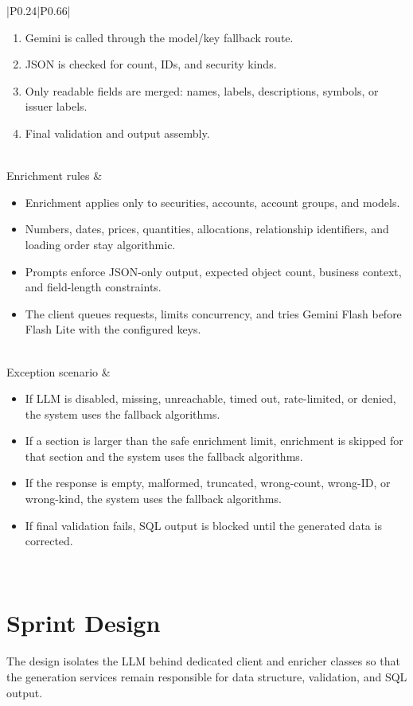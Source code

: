 \begin{longtable}{|P{0.24\linewidth}|P{0.66\linewidth}|}
\begin{enumerate}[leftmargin=*,nosep]
    \item Gemini is called through the model/key fallback route.
    \item JSON is checked for count, IDs, and security kinds.
    \item Only readable fields are merged: names, labels, descriptions, symbols, or issuer labels.
    \item Final validation and output assembly.
\end{enumerate} \\
\hline
Enrichment rules &
\begin{itemize}[leftmargin=*,nosep]
    \item Enrichment applies only to securities, accounts, account groups, and models.
    \item Numbers, dates, prices, quantities, allocations, relationship identifiers, and loading order stay algorithmic.
    \item Prompts enforce JSON-only output, expected object count, business context, and field-length constraints.
    \item The client queues requests, limits concurrency, and tries Gemini Flash before Flash Lite with the configured keys.
\end{itemize} \\
\hline
Exception scenario &
\begin{itemize}[leftmargin=*,nosep]
    \item If LLM is disabled, missing, unreachable, timed out, rate-limited, or denied, the system uses the fallback algorithms.
    \item If a section is larger than the safe enrichment limit, enrichment is skipped for that section and the system uses the fallback algorithms.
    \item If the response is empty, malformed, truncated, wrong-count, wrong-ID, or wrong-kind, the system uses the fallback algorithms.
    \item If final validation fails, SQL output is blocked until the generated data is corrected.
\end{itemize} \\
\hline
\end{longtable}
\renewcommand{\arraystretch}{1}

\section{Sprint Design}

\paragraph{}The design isolates the LLM behind dedicated client and enricher classes so that the
generation services remain responsible for data structure, validation, and SQL output.

